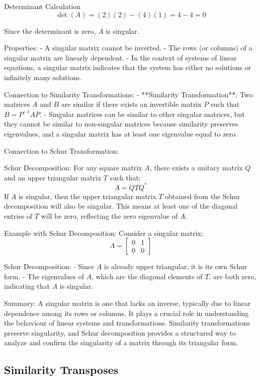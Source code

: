 Determinant Calculation
  \[
  \det(A) = (2)(2) - (4)(1) = 4 - 4 = 0
  \]

Since the determinant is zero, \( A \) is singular.

Properties:
- A singular matrix cannot be inverted.
- The rows (or columns) of a singular matrix are linearly dependent.
- In the context of systems of linear equations, a singular matrix indicates that the system has either no solutions or infinitely many solutions.

Connection to Similarity Transformations:
- **Similarity Transformation**: Two matrices \( A \) and \( B \) are similar if there exists an invertible matrix \( P \) such that \( B = P^{-1}AP \).
- Singular matrices can be similar to other singular matrices, but they cannot be similar to non-singular matrices because similarity preserves eigenvalues, and a singular matrix has at least one eigenvalue equal to zero.

Connection to Schur Transformation:

Schur Decomposition: For any square matrix \( A \), there exists a unitary matrix \( Q \) and an upper triangular matrix \( T \) such that:
  \[
  A = Q T Q^*
  \]
If \( A \) is singular, then the upper triangular matrix \( T \) obtained from the Schur decomposition will also be singular. This means at least one of the diagonal entries of \( T \) will be zero, reflecting the zero eigenvalue of \( A \).

Example with Schur Decomposition:
Consider a singular matrix:
\[ 
A = \begin{bmatrix} 0 & 1 \\ 0 & 0 \end{bmatrix}
\]

Schur Decomposition:
  - Since \( A \) is already upper triangular, it is its own Schur form.
  - The eigenvalues of \( A \), which are the diagonal elements of \( T \), are both zero, indicating that \( A \) is singular.

Summary:
A singular matrix is one that lacks an inverse, typically due to linear dependence among its rows or columns. It plays a crucial role in understanding the behaviour of linear systems and transformations. Similarity transformations preserve singularity, and Schur decomposition provides a structured way to analyze and confirm the singularity of a matrix through its triangular form.
\subsection{Similarity Transposes}
